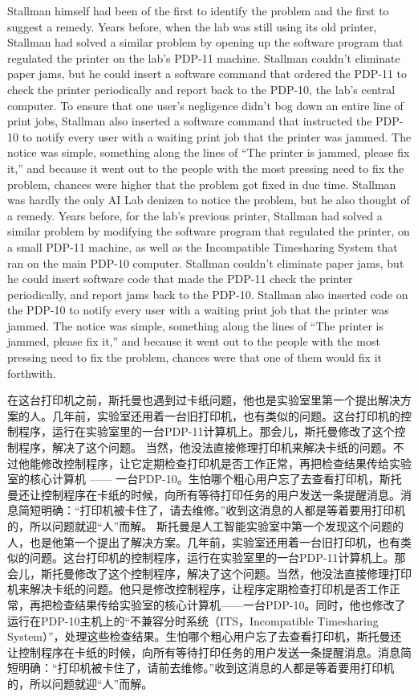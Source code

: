 \ifdefined\eng
\ifdefined\vone
Stallman himself had been of the first to identify the problem and the first to suggest a remedy. Years before, when the lab was still using its old printer, Stallman had solved a similar problem by opening up the software program that regulated the printer on the lab's PDP-11 machine. Stallman couldn't eliminate paper jams, but he could insert a software command that ordered the PDP-11 to check the printer periodically and report back to the PDP-10, the lab's central computer. To ensure that one user's negligence didn't bog down an entire line of print jobs, Stallman also inserted a software command that instructed the PDP-10 to notify every user with a waiting print job that the printer was jammed. The notice was simple, something along the lines of ``The printer is jammed, please fix it,'' and because it went out to the people with the most pressing need to fix the problem, chances were higher that the problem got fixed in due time.
\fi
\ifdefined\vtwo
Stallman was hardly the only AI Lab denizen to notice the problem, but he also thought of a remedy. Years before, for the lab's previous printer, Stallman had solved a similar problem by modifying the software program that regulated the printer, on a small PDP-11 machine, as well as the Incompatible Timesharing System that ran on the main PDP-10 computer. Stallman couldn't eliminate paper jams, but he could insert software code that made the PDP-11 check the printer periodically, and report jams back to the PDP-10. Stallman also inserted code on the PDP-10 to notify every user with a waiting print job that the printer was jammed. The notice was simple, something along the lines of ``The printer is jammed, please fix it,'' and because it went out to the people with the most pressing need to fix the problem, chances were that one of them would fix it forthwith.
\fi
\fi

\ifdefined\chs
\ifdefined\vone
在这台打印机之前，斯托曼也遇到过卡纸问题，他也是实验室里第一个提出解决方案的人。几年前，实验室还用着一台旧打印机，也有类似的问题。这台打印机的控制程序，运行在实验室里的一台PDP-11计算机上。那会儿，斯托曼修改了这个控制程序，解决了这个问题。
当然，他没法直接修理打印机来解决卡纸的问题。不过他能修改控制程序，让它定期检查打印机是否工作正常，再把检查结果传给实验室的核心计算机
——
一台PDP-10。生怕哪个粗心用户忘了去查看打印机，斯托曼还让控制程序在卡纸的时候，向所有等待打印任务的用户发送一条提醒消息。消息简短明确：``打印机被卡住了，请去维修。''收到这消息的人都是等着要用打印机的，所以问题就迎``人''而解。
\fi
\ifdefined\vtwo
斯托曼是人工智能实验室中第一个发现这个问题的人，也是他第一个提出了解决方案。几年前，实验室还用着一台旧打印机，也有类似的问题。这台打印机的控制程序，运行在实验室里的一台PDP-11计算机上。那会儿，斯托曼修改了这个控制程序，解决了这个问题。当然，他没法直接修理打印机来解决卡纸的问题。他只是修改控制程序，让程序定期检查打印机是否工作正常，再把检查结果传给实验室的核心计算机——一台PDP-10。同时，他也修改了运行在PDP-10主机上的``不兼容分时系统（ITS，Incompatible Timesharing System）''，处理这些检查结果。生怕哪个粗心用户忘了去查看打印机，斯托曼还让控制程序在卡纸的时候，向所有等待打印任务的用户发送一条提醒消息。消息简短明确：``打印机被卡住了，请前去维修。''收到这消息的人都是等着要用打印机的，所以问题就迎``人''而解。
\fi
\fi

